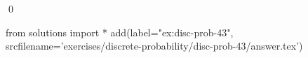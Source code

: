 
\begin{ex} 
  \label{ex:disc-prob-43}
  
  \qed
\end{ex} 
\begin{python0}
from solutions import *
add(label="ex:disc-prob-43",
    srcfilename='exercises/discrete-probability/disc-prob-43/answer.tex') 
\end{python0}
